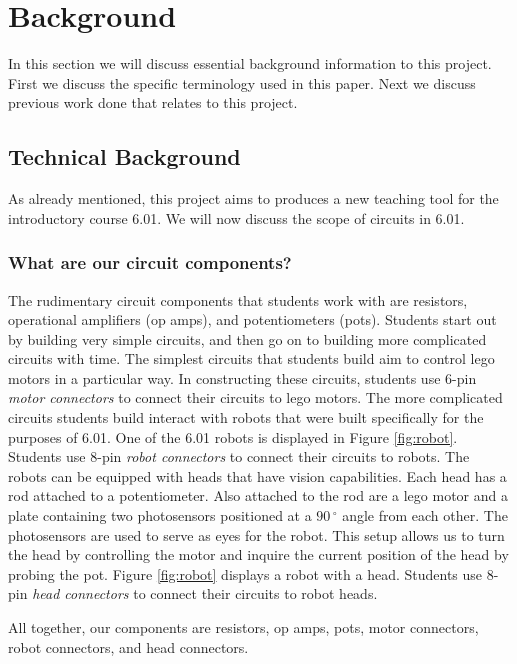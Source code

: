 
\chapter{Background}

In this section we will discuss essential background information to this project.
First we discuss the specific terminology used in this paper. Next we discuss
previous work done that relates to this project.

\section{Technical Background}

As already mentioned, this project aims to produces a new teaching tool for the
introductory course 6.01. We will now discuss the scope of circuits in 6.01.

\subsection{What are our circuit components?}

The rudimentary circuit components that students work with are resistors,
operational amplifiers (op amps), and potentiometers (pots). Students start out
by building very simple circuits, and then go on to building
more complicated circuits with time. The simplest circuits that students build
aim to control lego motors in a particular way. In constructing these circuits,
students use $6$-pin \textit{motor connectors} to connect their circuits to
lego motors.
The more complicated circuits students build interact with robots that were
built specifically for the purposes of 6.01. One of the 6.01 robots is displayed
in Figure \ref{fig:robot}. Students use $8$-pin \textit{robot connectors} to
connect their circuits to robots. The robots can be equipped with heads that have
vision capabilities. Each head has a rod attached to a potentiometer. Also attached
to the rod are a lego motor and a plate containing two photosensors positioned
at a $90\,^{\circ}$ angle from each other. The
photosensors are used to serve as eyes for the robot. This setup allows us to
turn the head by controlling the motor and inquire the current position of the
head by probing the pot. Figure \ref{fig:robot} displays a robot with a head.
Students use $8$-pin \textit{head connectors} to connect their circuits to
robot heads.

All together, our components are resistors, op amps, pots, motor connectors,
robot connectors, and head connectors.

